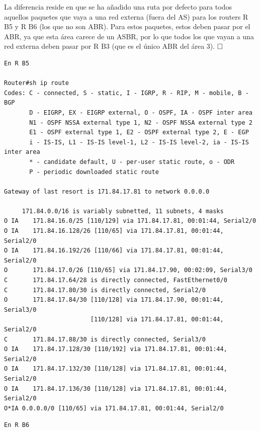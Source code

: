 \documentclass[twoside, 11pt]{article}
\begin{document}
\begin{enumerate}
La diferencia reside en que se ha añadido una ruta por defecto para todos aquellos paquetes que vaya a una red externa (fuera del AS) para los routers R B5 y R B6 (los que no son ABR). Para estos paquetes, estos deben pasar por el ABR, ya que esta área carece de un ASBR, por lo que todos los que vayan a una red externa deben pasar por R B3 (que es el único ABR del área 3). $\hfill\square$

\begin{center}
\begin{verbatim}
En R B5

Router#sh ip route 
Codes: C - connected, S - static, I - IGRP, R - RIP, M - mobile, B - BGP
       D - EIGRP, EX - EIGRP external, O - OSPF, IA - OSPF inter area
       N1 - OSPF NSSA external type 1, N2 - OSPF NSSA external type 2
       E1 - OSPF external type 1, E2 - OSPF external type 2, E - EGP
       i - IS-IS, L1 - IS-IS level-1, L2 - IS-IS level-2, ia - IS-IS inter area
       * - candidate default, U - per-user static route, o - ODR
       P - periodic downloaded static route

Gateway of last resort is 171.84.17.81 to network 0.0.0.0

     171.84.0.0/16 is variably subnetted, 11 subnets, 4 masks
O IA    171.84.16.0/25 [110/129] via 171.84.17.81, 00:01:44, Serial2/0
O IA    171.84.16.128/26 [110/65] via 171.84.17.81, 00:01:44, Serial2/0
O IA    171.84.16.192/26 [110/66] via 171.84.17.81, 00:01:44, Serial2/0
O       171.84.17.0/26 [110/65] via 171.84.17.90, 00:02:09, Serial3/0
C       171.84.17.64/28 is directly connected, FastEthernet0/0
C       171.84.17.80/30 is directly connected, Serial2/0
O       171.84.17.84/30 [110/128] via 171.84.17.90, 00:01:44, Serial3/0
                        [110/128] via 171.84.17.81, 00:01:44, Serial2/0
C       171.84.17.88/30 is directly connected, Serial3/0
O IA    171.84.17.128/30 [110/192] via 171.84.17.81, 00:01:44, Serial2/0
O IA    171.84.17.132/30 [110/128] via 171.84.17.81, 00:01:44, Serial2/0
O IA    171.84.17.136/30 [110/128] via 171.84.17.81, 00:01:44, Serial2/0
O*IA 0.0.0.0/0 [110/65] via 171.84.17.81, 00:01:44, Serial2/0
\end{verbatim}
\label{list:2.1.2.5.1}

\begin{verbatim}
En R B6


\end{verbatim}
\end{center}
\end{enumerate}
\end{document}

